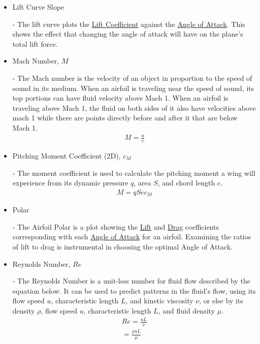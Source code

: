 \documentclass{article}
\begin{document}
\begin{itemize}
	\item \hypertarget{LC}{Lift Curve Slope} - The lift curve plots the \hyperlink{CL}{Lift Coefficient} against the \hyperlink{alpha}{Angle of Attack}. This shows the effect that changing the angle of attack will have on the plane's total lift force.
		
	\item \hypertarget{M}{Mach Number, $M$} - The Mach number is the velocity of an object in proportion to the speed of sound in its medium. When an airfoil is traveling near the speed of sound, its top portions can have fluid velocity above Mach 1. When an airfoil is traveling above Mach 1, the fluid on both sides of it also have velocities above mach 1 while there are points directly before and after it that are below Mach 1.
		\begin{equation} \label{eq:4}
		\begin{aligned}
        			M = \frac{u}{c}
	    	\end{aligned}
		\end{equation}
		
	\item \hypertarget{CM}{Pitching Moment Coefficient (2D), $c_{M}$} - The moment coefficient is used to calculate the pitching moment a wing will experience from its dynamic pressure $q$, area $S$, and chord length $c$.
		\begin{equation} \label{eq:5}
		\begin{aligned}
        			M = q S e c_{M}
	    	\end{aligned}
		\end{equation}

	\item \hypertarget{AP}{Polar} - The Airfoil Polar is a plot showing the  \hyperlink{CL}{Lift} and  \hyperlink{CD}{Drag} coefficients corresponding with each \hyperlink{alpha}{Angle of Attack} for an airfoil. Examining the ratios of lift to drag is instrumental in choosing the optimal Angle of Attack.
	
	\item \hypertarget{Re}{Reynolds Number, $Re$} - The Reynolds Number is a unit-less number for fluid flow described by the equation below. It can be used to predict patterns in the fluid's flow, using its flow speed $u$, characteristic length $L$, and kinetic viscosity $\nu$, or else by its density $\rho$, flow speed $u$, characteristic length $L$, and fluid density $\mu$.
		\begin{equation} \label{eq:6}
		\begin{aligned}
        			Re = \frac{uL}{\nu} \\
			= \frac{\rho uL}{\mu} 
	    	\end{aligned}
		\end{equation}
	

\end{itemize}
\end{document}
